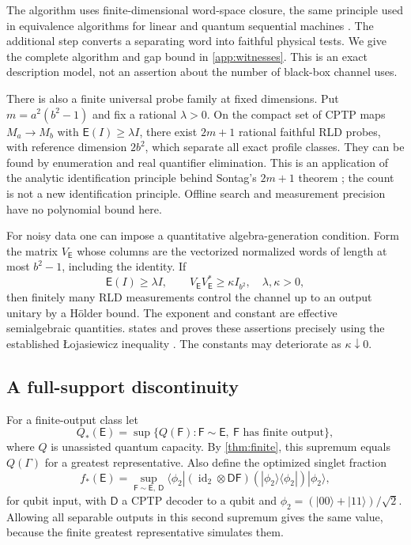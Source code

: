 \documentclass[11pt,reqno]{amsart}
\theoremstyle{definition}
\theoremstyle{remark}
\numberwithin{equation}{section}
\DeclareMathOperator{\id}{id}
\newcommand{\E}{\mathsf E}
\newcommand{\F}{\mathsf F}
\begin{document}
The algorithm uses finite-dimensional word-space closure, the same principle used in equivalence algorithms for linear and quantum sequential machines \cite[Theorem~2]{LiQiu}. The additional step converts a separating word into faithful physical tests. We give the complete algorithm and gap bound in \cref{app:witnesses}. This is an exact description model, not an assertion about the number of black-box channel uses.

There is also a finite universal probe family at fixed dimensions. Put $m=a^2(b^2-1)$ and fix a rational $\lambda>0$. On the compact set of CPTP maps $M_a\to M_b$ with $\E(I)\ge\lambda I$, there exist $2m+1$ rational faithful RLD probes, with reference dimension $2b^2$, which separate all exact profile classes. They can be found by enumeration and real quantifier elimination. This is an application of the analytic identification principle behind Sontag's $2m+1$ theorem \cite[Theorem~2]{Sontag}; the count is not a new identification principle. Offline search and measurement precision have no polynomial bound here.

For noisy data one can impose a quantitative algebra-generation condition. Form the matrix $V_\E$ whose columns are the vectorized normalized words of length at most $b^2-1$, including the identity. If
\begin{equation}\label{eq:conditioning}
 \E(I)\ge\lambda I,\qquad V_\E V_\E^*\ge\kappa I_{b^2},
 \quad\lambda,\kappa>0,
\end{equation}
then finitely many RLD measurements control the channel up to an output unitary by a H\"older bound. The exponent and constant are effective semialgebraic quantities.  states and proves these assertions precisely using the established \L ojasiewicz inequality \cite[Theorem~2.2]{BasuMN}. The constants may deteriorate as $\kappa\downarrow0$.

\subsection{A full-support discontinuity}

For a finite-output class let
\[
 Q_*(\E)=\sup\{Q(\F):\F\sim\E,\ \F\text{ has finite output}\},
\]
where $Q$ is unassisted quantum capacity. By \cref{thm:finite}, this supremum equals $Q(\Gamma)$ for a greatest representative. Also define the optimized singlet fraction
\[
 f_*(\E)=\sup_{\F\sim\E,\ \mathsf D}
 \langle\phi_2|(\id_2\otimes\mathsf D\F)(|\phi_2\rangle\langle\phi_2|)|\phi_2\rangle,
\]
for qubit input, with $\mathsf D$ a CPTP decoder to a qubit and $\phi_2=(|00\rangle+|11\rangle)/\sqrt2$. Allowing all separable outputs in this second supremum gives the same value, because the finite greatest representative simulates them.
\end{document}
